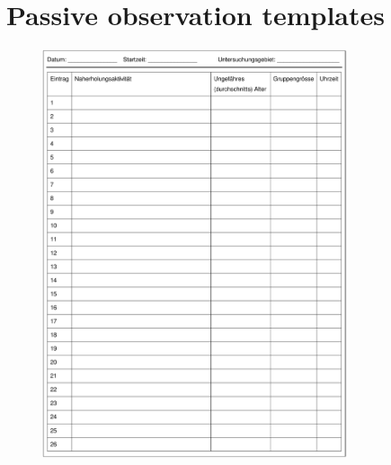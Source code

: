 \chapter{Passive observation templates} \label{passive_obs_templates}

\begin{figure}[h!]
   \centering
   \includegraphics[width=0.8\textwidth]{code/passive_observation_template_cropped.pdf}
   \label{fig:passive_obs_template_appendix}
\end{figure}
